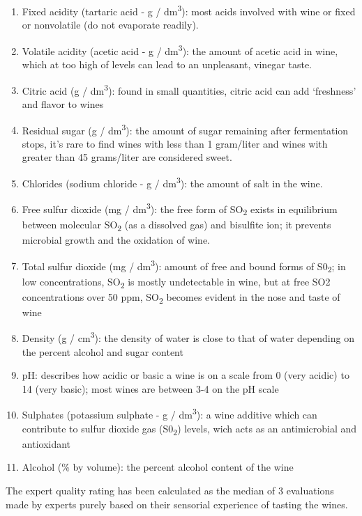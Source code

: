 \documentclass[]{article}
\providecommand{\tightlist}{%
  \setlength{\itemsep}{0pt}\setlength{\parskip}{0pt}}
\begin{document}
\begin{enumerate}
\def\labelenumi{\arabic{enumi}.}
\tightlist
\item
  Fixed acidity (tartaric acid - g / dm\textsuperscript{3}): most acids
  involved with wine or fixed or nonvolatile (do not evaporate readily).
\item
  Volatile acidity (acetic acid - g / dm\textsuperscript{3}): the amount
  of acetic acid in wine, which at too high of levels can lead to an
  unpleasant, vinegar taste.
\item
  Citric acid (g / dm\textsuperscript{3}): found in small quantities,
  citric acid can add `freshness' and flavor to wines
\item
  Residual sugar (g / dm\textsuperscript{3}): the amount of sugar
  remaining after fermentation stops, it's rare to find wines with less
  than 1 gram/liter and wines with greater than 45 grams/liter are
  considered sweet.
\item
  Chlorides (sodium chloride - g / dm\textsuperscript{3}): the amount of
  salt in the wine.
\item
  Free sulfur dioxide (mg / dm\textsuperscript{3}): the free form of
  SO\textsubscript{2} exists in equilibrium between molecular
  SO\textsubscript{2} (as a dissolved gas) and bisulfite ion; it
  prevents microbial growth and the oxidation of wine.
\item
  Total sulfur dioxide (mg / dm\textsuperscript{3}): amount of free and
  bound forms of S0\textsubscript{2}; in low concentrations,
  SO\textsubscript{2} is mostly undetectable in wine, but at free SO2
  concentrations over 50 ppm, SO\textsubscript{2} becomes evident in the
  nose and taste of wine
\item
  Density (g / cm\textsuperscript{3}): the density of water is close to
  that of water depending on the percent alcohol and sugar content
\item
  pH: describes how acidic or basic a wine is on a scale from 0 (very
  acidic) to 14 (very basic); most wines are between 3-4 on the pH scale
\item
  Sulphates (potassium sulphate - g / dm\textsuperscript{3}): a wine
  additive which can contribute to sulfur dioxide gas
  (S0\textsubscript{2}) levels, wich acts as an antimicrobial and
  antioxidant
\item
  Alcohol (\% by volume): the percent alcohol content of the wine
\end{enumerate}

The expert quality rating has been calculated as the median of 3
evaluations made by experts purely based on their sensorial experience
of tasting the wines.
\end{document}
